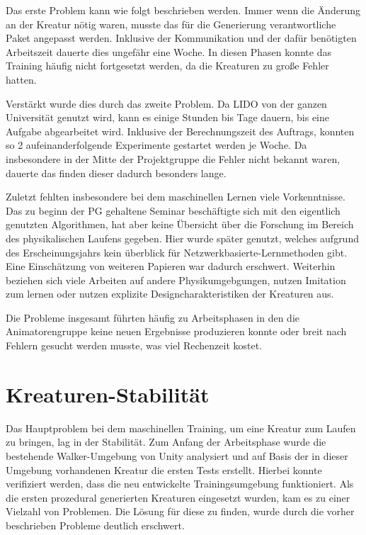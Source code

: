 Das erste Problem kann wie folgt beschrieben werden. Immer wenn die Änderung an der Kreatur nötig waren, musste das für die Generierung verantwortliche Paket angepasst werden. Inklusive der Kommunikation und der dafür benötigten Arbeitszeit dauerte dies ungefähr eine Woche. In diesen Phasen konnte das Training häufig nicht fortgesetzt werden, da die Kreaturen zu große Fehler hatten. 

Verstärkt wurde dies durch das zweite Problem. Da LIDO von der ganzen Universität genutzt wird, kann es einige Stunden bis Tage dauern, bis eine Aufgabe abgearbeitet wird. Inklusive der Berechnungszeit des Auftrags, konnten so 2 aufeinanderfolgende Experimente gestartet werden je Woche. Da insbesondere in der Mitte der Projektgruppe die Fehler nicht bekannt waren, dauerte das finden dieser dadurch besonders lange. 

Zuletzt fehlten insbesondere bei dem maschinellen Lernen viele Vorkenntnisse. Das zu beginn der PG gehaltene Seminar beschäftigte sich mit den eigentlich genutzten Algorithmen, hat aber keine Übersicht über die Forschung im Bereich des physikalischen Laufens gegeben. Hier wurde später \cite{Geijtenbeek2012} genutzt, welches aufgrund des Erscheinungsjahrs kein überblick für Netzwerkbasierte-Lernmethoden gibt. Eine Einschätzung von weiteren Papieren war dadurch erschwert. Weiterhin beziehen sich viele Arbeiten auf andere Physikumgebgungen, nutzen Imitation zum lernen oder nutzen explizite Designcharakteristiken der Kreaturen aus\cite{Mourot2022}.

Die Probleme insgesamt führten häufig zu Arbeitsphasen in den die Animatorengruppe keine neuen Ergebnisse produzieren konnte oder breit nach Fehlern gesucht werden musste, was viel Rechenzeit kostet.

\section{Kreaturen-Stabilität} %
Das Hauptproblem bei dem maschinellen Training, um eine Kreatur zum Laufen zu bringen, lag in der Stabilität. Zum Anfang der Arbeitsphase wurde die bestehende Walker-Umgebung von Unity analysiert und auf Basis der in dieser Umgebung vorhandenen Kreatur die ersten Tests erstellt. Hierbei konnte verifiziert werden, dass die neu entwickelte Trainingsumgebung funktioniert. Als die ersten prozedural generierten Kreaturen eingesetzt wurden, kam es zu einer Vielzahl von Problemen. Die Lösung für diese zu finden, wurde durch die vorher beschrieben Probleme deutlich erschwert.
